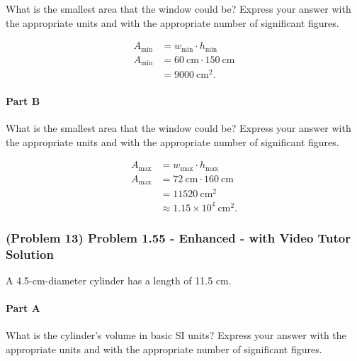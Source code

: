 What is the smallest area that the window could be? Express your answer with the appropriate units and with the appropriate number of significant figures.

\vspace{1em}

\begin{solution}
	\begin{align*}
		A_{\text{min}} &= w_{\text{min}} \cdot h_{\text{min}} \\
		A_{\text{min}} &= 60~\text{cm} \cdot 150~\text{cm} \\
		&= 9000~\text{cm}^2
		.\end{align*}
\end{solution}

\paragraph{Part B}

What is the smallest area that the window could be? Express your answer with the appropriate units and with the appropriate number of significant figures.

\vspace{1em}

\begin{solution}
	\begin{align*}
		A_{\text{max}} &= w_{\text{max}} \cdot h_{\text{max}} \\
		A_{\text{max}} &= 72~\text{cm} \cdot 160~\text{cm} \\
		&= 11520~\text{cm}^2 \\
		&\approx 1.15 \times 10^{4}~\text{cm}^2
		.\end{align*}
\end{solution}

\newpage

\subsubsection{(Problem 13) Problem 1.55 - Enhanced - with Video Tutor Solution}

A 4.5-cm-diameter cylinder has a length of 11.5 cm.

\paragraph{Part A}

What is the cylinder's volume in basic SI units? Express your answer with the appropriate units and with the appropriate number of significant figures.


